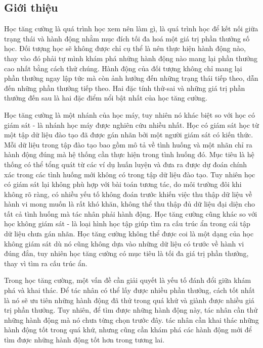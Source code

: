 \documentclass{uetgraduation}
\begin{document}
\subsection{Giới thiệu}
Học tăng cường là quá trình học xem nên làm gì, là quá trình học để kết nối giữa trạng thái và hành động nhằm mục đích tối đa hoá một giá trị phần thưởng số học. Đối tượng học sẽ không được chỉ cụ thể là
nên thực hiện hành động nào, thay vào đó phải tự mình khám phá những hành động nào mang lại phần thưởng cao nhất bằng cách thử chúng. Hành động của đối tượng không chỉ mang lại phần thưởng ngay lập tức mà còn ảnh hưởng
đến những trạng thái tiếp theo, dẫn đến những phần thưởng tiếp theo. Hai đặc tính thử-sai và những giá trị phần thưởng đến sau là hai đặc điểm nổi bật nhất của học tăng cường.

Học tăng cường là một nhánh của học máy, tuy nhiên nó khác biệt so với học có giám sát - là nhánh học máy được nghiên cứu nhiều nhất. Học có giám sát học từ một tập dữ liệu đào tạo đã được gán nhãn
bởi một người giám sát có kiến thức. Mỗi dữ liệu trong tập đào tạo bao gồm mô tả về tình huống và một nhãn chỉ ra hành động đúng mà hệ thống cần thực hiện trong tình huống đó. Mục tiêu là hệ thống
có thể tổng quát từ các ví dụ huấn luyện và đưa ra được dự đoán chính xác trong các tình huống mới không có trong tập dữ liệu đào tạo. Tuy nhiên học có giám sát lại không phù hợp với bài toán tương
tác, do môi trường đôi khi không rõ ràng, có nhiều yếu tố không đoán trước khiến việc thu thập dữ liệu về hành vi mong muốn là rất khó khăn, không thể thu thập đủ dữ liệu đại diện cho tất cả tình huống
mà tác nhân phải hành động. Học tăng cường cũng khác so với học không giám sát - là loại hình học tập giúp tìm ra cấu trúc ẩn trong cái tập dữ liệu chưa gán nhãn. Học tăng cường không thể được coi là
một dạng của học không giám sát dù nó cũng không dựa vào những dữ liệu có trước về hành vi đúng đắn, tuy nhiên học tăng cường có mục tiêu là tối đa giá trị phần thưởng, thay vì tìm ra cấu trúc ẩn.

Trong học tăng cường, một vấn đề cần giải quyết là yếu tố đánh đổi giữa khám phá và khai thác. Để tác nhân có thể lấy được nhiều phần thưởng, cách tốt nhất là nó sẽ ưu tiên những hành động đã thử trong
quá khứ và giành được nhiều giá trị phần thưởng. Tuy nhiên, để tìm được những hành động này, tác nhân cần thử những hành động mà nó chưa từng chọn trước đây. tác nhân cần khai thác những hành động tốt trong
quá khứ, nhưng cũng cần khám phá các hành động mới để tìm được những hành động tốt hơn trong tương lai.
\end{document}

